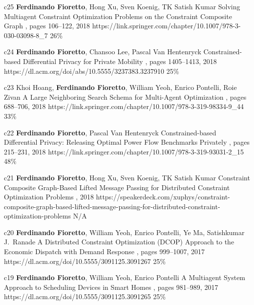 \begin{pubs}
	\confentry 
		{c25} %
		{{\bf Ferdinando Fioretto}, Hong Xu, Sven Koenig, TK Satish Kumar}
	 	{Solving Multiagent Constraint Optimization Problems on the Constraint Composite Graph}
		{\procPRIMA, pages 106--122, 2018}
		{https://link.springer.com/chapter/10.1007/978-3-030-03098-8\_7}
	    {26\%} %

	\confentry
		{c24} %
	  	{{\bf Ferdinando Fioretto}, Chansoo Lee, Pascal Van Hentenryck}
	  	{Constrained-based Differential Privacy for Private Mobility} 
	  	{\procAAMAS, pages 1405--1413, 2018}
	  	{https://dl.acm.org/doi/abs/10.5555/3237383.3237910}
	    {25\%} %

	\confentry 
		{c23} %
		{Khoi Hoang, {\bf Ferdinando Fioretto}, William Yeoh, Enrico Pontelli, Roie Zivan}
		{A Large Neighboring Search Schema for Multi-Agent Optimization}
		{\procCP, pages 688--706, 2018}
		{https://link.springer.com/chapter/10.1007/978-3-319-98334-9\_44}
	    {33\%} %

	\confentry 
		{c22} %
		{{\bf Ferdinando Fioretto}, Pascal Van Hentenryck}
		{Constrained-based Differential Privacy: Releasing Optimal Power Flow Benchmarks Privately} 
		{\procCPAIOR, pages 215--231, 2018}
		{https://link.springer.com/chapter/10.1007/978-3-319-93031-2\_15}
	    {48\%}

	\confentry
		{c21} %
		{{\bf Ferdinando Fioretto}, Hong Xu, Sven Koenig, TK Satish Kumar}
		{Constraint Composite Graph-Based Lifted Message Passing for Distributed Constraint Optimization Problems}
		{\procISIAM, 2018}
		{https://speakerdeck.com/xuphys/constraint-composite-graph-based-lifted-message-passing-for-distributed-constraint-optimization-problems}
		{N/A}

	\confentry 
		{c20} %
		{{\bf Ferdinando Fioretto}, William Yeoh, Enrico Pontelli, Ye Ma, Satishkumar J.~Ranade}
		{A Distributed Constraint Optimization (DCOP) Approach to the Economic Dispatch with Demand Response}
		{\procAAMAS, pages  999--1007, 2017}
		{https://dl.acm.org/doi/10.5555/3091125.3091267}
		{25\%}%

	\confentry 
		{c19} %
		{{\bf Ferdinando Fioretto},  William Yeoh, Enrico Pontelli}
		{A Multiagent System Approach to Scheduling Devices in Smart Homes}
		{\procAAMAS, pages 981--989, 2017} 
		{https://dl.acm.org/doi/10.5555/3091125.3091265}
		{25\%}%


\end{pubs}
